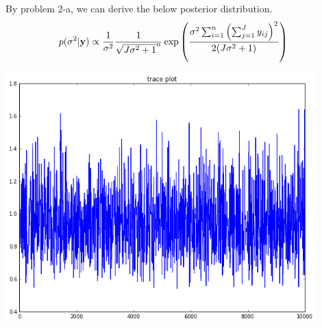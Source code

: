 \documentclass{article}
\begin{document}
	\subsection{}
	By problem 2-a, we can derive the below posterior distribution.
		\begin{align*}
		p(\sigma^2 | {\bf y}) &\propto \frac{1}{\sigma^2} \frac{1}{\sqrt{J\sigma^2 + 1}^n} \exp \left( \frac{\sigma^2 \sum_{i=1}^{n} \left( \sum_{j=1}^{J} y_{ij}\right)^2}{2(J\sigma^2+ 1)}\right)
		\end{align*}
		
		\begin{center}
		\includegraphics[width = 12cm]{2-c.png}
		\end{center}		
\end{document}
